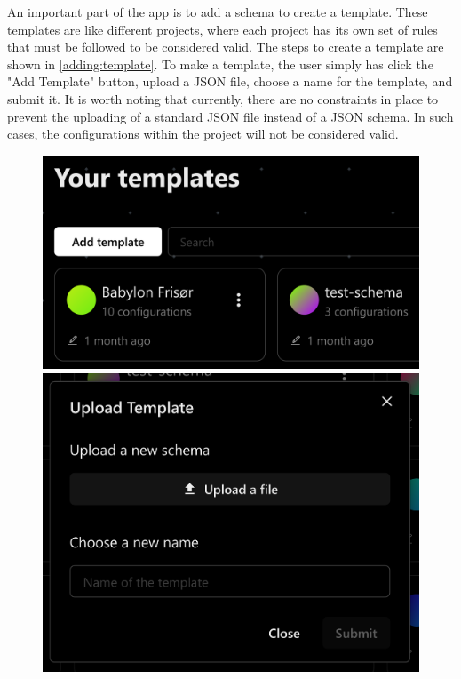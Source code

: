 An important part of the app is to add a schema to create a template. These templates are like different projects, where each project has its own set of rules that must be followed to be considered valid. The steps to create a template are shown in \autoref{adding:template}. To make a template, the user simply has click the "Add Template" button, upload a JSON file, choose a name for the template, and submit it. It is worth noting that currently, there are no constraints in place to prevent the uploading of a standard JSON file instead of a JSON schema. In such cases, the configurations within the project will not be considered valid.

\begin{figure}[!ht]
   \begin{minipage}{0.38\textwidth}
     \centering
     \includegraphics[width=1.\linewidth]{Figures/templates-page/add-template-button.pdf}
   \end{minipage}
   \hspace{0.2cm}
   \begin{minipage}{0.3\textwidth}
     \centering
     \includegraphics[width=.9\linewidth]{Figures/templates-page/add-template-dialog.pdf}

\end{minipage}
\end{figure}
